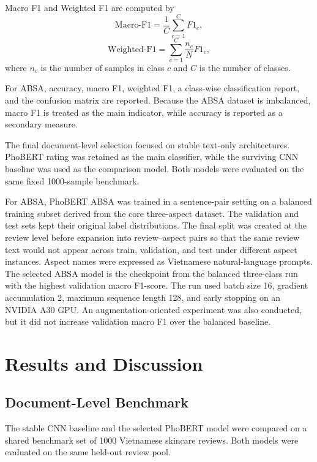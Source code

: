\documentclass[a4paper,12pt]{extarticle}
\begin{document}
Macro F1 and Weighted F1 are computed by
\begin{equation}
\mathrm{Macro\mbox{-}F1} = \frac{1}{C} \sum_{c=1}^{C} F1_c,
\end{equation}
\begin{equation}
\mathrm{Weighted\mbox{-}F1} = \sum_{c=1}^{C} \frac{n_c}{N} F1_c,
\end{equation}
where $n_c$ is the number of samples in class $c$ and $C$ is the number of classes.

For ABSA, accuracy, macro F1, weighted F1, a class-wise classification report, and the confusion matrix are reported. Because the ABSA dataset is imbalanced, macro F1 is treated as the main indicator, while accuracy is reported as a secondary measure.


The final document-level selection focused on stable text-only architectures. PhoBERT rating was retained as the main classifier, while the surviving CNN baseline was used as the comparison model. Both models were evaluated on the same fixed 1000-sample benchmark.



For ABSA, PhoBERT ABSA was trained in a sentence-pair setting on a balanced training subset derived from the core three-aspect dataset. The validation and test sets kept their original label distributions. The final split was created at the review level before expansion into review--aspect pairs so that the same review text would not appear across train, validation, and test under different aspect instances. Aspect names were expressed as Vietnamese natural-language prompts. The selected ABSA model is the checkpoint from the balanced three-class run with the highest validation macro F1-score. The run used batch size 16, gradient accumulation 2, maximum sequence length 128, and early stopping on an NVIDIA A30 GPU. An augmentation-oriented experiment was also conducted, but it did not increase validation macro F1 over the balanced baseline.


\section{Results and Discussion}

\subsection{Document-Level Benchmark}


The stable CNN baseline and the selected PhoBERT model were compared on a shared benchmark set of 1000 Vietnamese skincare reviews. Both models were evaluated on the same held-out review pool.
\end{document}
